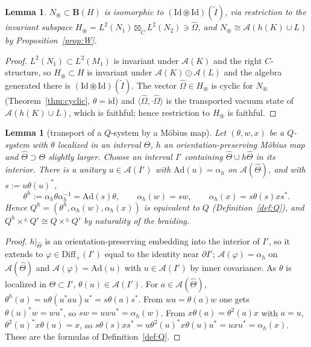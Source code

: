 \documentclass[11pt]{article}
\newtheorem{lemma}[theorem]{Lemma}
\theoremstyle{definition}
\theoremstyle{remark}
\newcommand{\cA}{\mathcal A}
\newcommand{\Om}{\Omega}
\newcommand{\bfB}{\mathbf B}
\newcommand{\fus}{\boxtimes}
\newcommand{\cfus}{\circledast}
\newcommand{\ip}[2]{\langle #1,#2\rangle}
\newcommand{\Id}{\mathrm{Id}}
\begin{document}
\begin{lemma}\label{lem:Nid}
$N_\circledast\subset\bfB(H)$ is isomorphic to $(\Id\cfus\Id)(\tilde I)$, via restriction to the invariant subspace $H_\circledast=L^2(N_1)\fus_{\tilde C}L^2(N_2)\ni\hat\Om$, and $N_\circledast\cong\cA(h(K)\cup L)$ by Proposition~\ref{prop:W}.
\end{lemma}
\begin{proof}
$L^2(N_1)\subset L^2(M_1)$ is invariant under $\cA(K)$ and the right $C$-structure, so $H_\circledast\subset H$ is invariant under $\cA(K)\odot\cA(L)$ and the algebra generated there is $(\Id\cfus\Id)(\tilde I)$. The vector $\hat\Om\in H_\circledast$ is cyclic for $N_\circledast$ (Theorem~\ref{thm:cyclic}, $\theta=\mathrm{id}$) and $\ip{\hat\Om}{\cdot\hat\Om}$ is the transported vacuum state of $\cA(h(K)\cup L)$, which is faithful; hence restriction to $H_\circledast$ is faithful.
\end{proof}

\begin{lemma}[transport of a $Q$-system by a M\"obius map]\label{lem:Qh}
Let $(\theta,w,x)$ be a $Q$-system with $\theta$ localized in an interval $\Theta$, $h$ an orientation-preserving M\"obius map and $\hat\Theta\supset\Theta$ slightly larger. Choose an interval $I'$ containing $\hat\Theta\cup h\hat\Theta$ in its interior. There is a unitary $u\in\cA(I')$ with $\mathrm{Ad}(u)=\alpha_h$ on $\cA(\hat\Theta)$, and with $s:=u\theta(u)^*$,
\[
\theta^h:=\alpha_h\theta\alpha_h^{-1}=\mathrm{Ad}(s)\theta,\qquad \alpha_h(w)=sw,\qquad \alpha_h(x)=s\theta(s)xs^*.
\]
Hence $Q^h=(\theta^h,\alpha_h(w),\alpha_h(x))$ is equivalent to $Q$ (Definition~\ref{def:Q}), and $Q^h\times^\pm Q'\cong Q\times^\pm Q'$ by naturality of the braiding.
\end{lemma}
\begin{proof}
$h|_{\hat\Theta}$ is an orientation-preserving embedding into the interior of $I'$, so it extends to $\varphi\in\mathrm{Diff}_+(I')$ equal to the identity near $\partial I'$; $\cA(\varphi)=\alpha_h$ on $\cA(\hat\Theta)$ and $\cA(\varphi)=\mathrm{Ad}(u)$ with $u\in\cA(I')$ by inner covariance. As $\theta$ is localized in $\Theta\subset I'$, $\theta(u)\in\cA(I')$. For $a\in\cA(\hat\Theta)$, $\theta^h(a)=u\theta(u^*au)u^*=s\theta(a)s^*$. From $wa=\theta(a)w$ one gets $\theta(u)^*w=wu^*$, so $sw=uwu^*=\alpha_h(w)$. From $x\theta(a)=\theta^2(a)x$ with $a=u$, $\theta^2(u)^*x\theta(u)=x$, so $s\theta(s)xs^*=u\theta^2(u)^*x\theta(u)u^*=uxu^*=\alpha_h(x)$. These are the formulas of Definition~\ref{def:Q}.
\end{proof}
\end{document}
